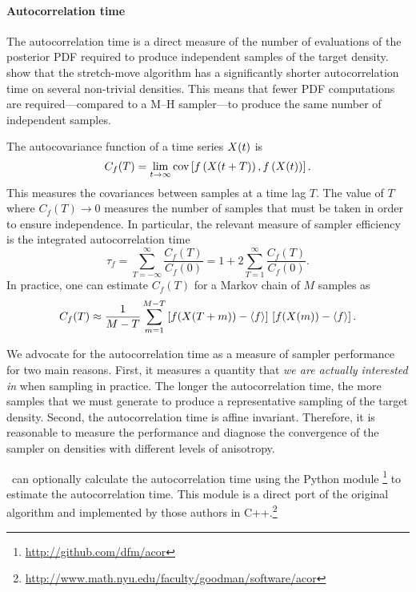 \paragraph{Autocorrelation time} 

The autocorrelation time is a direct measure of the number of evaluations of
the posterior PDF required to produce independent samples of the target
density.  show that the stretch-move algorithm
has a significantly shorter autocorrelation time on several non-trivial
densities. This means that fewer PDF computations are required---compared
to a M--H sampler---to produce the same number of independent samples.

The autocovariance function of a time series $X (t)$ is
\begin{equation}
    C_f (T) = \lim_{t \to \infty} \mathrm{cov}
        \left [ f\left (X(t+T) \right ),
            f\left (X(t) \right ) \right ].
\end{equation}
This measures the covariances between samples at a time lag $T$. The
value of $T$ where $C_f(T) \to 0$ measures the number of samples that
must be taken in order to ensure independence. In particular, the
relevant measure of sampler efficiency is the integrated autocorrelation
time
\begin{equation}
    \tau_f = \sum_{T=-\infty} ^{\infty} \frac{C_f(T)}{C_f(0)}
        = 1+2\sum_{T=1} ^{\infty} \frac{C_f(T)}{C_f(0)}.
\end{equation}
In practice, one can estimate $C_f (T)$ for a Markov chain of $M$ samples as
\begin{equation}
    C_f (T) \approx \frac{1}{M-T} \sum_{m=1}^{M-T}
        \left [ f(X(T+m)) - \left<f\right> \right ] \,
        \left [ f(X(m)) - \left<f\right> \right ].
\end{equation}

We advocate for the autocorrelation time as a measure of sampler
performance for two main reasons. First, it measures a quantity
that \emph{we are actually interested in} when sampling in practice.
The longer the autocorrelation time, the more samples that we must
generate to produce a representative sampling of the target
density. Second, the autocorrelation time is affine invariant. Therefore,
it is reasonable to measure the performance and diagnose the convergence
of the sampler on densities with different levels of anisotropy.

\this\ can optionally calculate the autocorrelation time using the Python
module \footnote{\url{http://github.com/dfm/acor}} to estimate
the autocorrelation time. This module is a direct port of the original
algorithm  and implemented by those
authors in
C++.\footnote{\url{http://www.math.nyu.edu/faculty/goodman/software/acor}}

